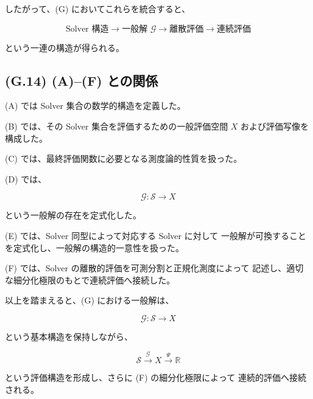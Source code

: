 \documentclass[a4paper,11pt]{article}
\begin{document}
したがって、(G) においてこれらを統合すると、

\begin{equation}
    \boxed{
        \text{Solver 構造}
        \longrightarrow
        \text{一般解 }\mathcal{G}
        \longrightarrow
        \text{離散評価}
        \longrightarrow
        \text{連続評価}
    }
\end{equation}

という一連の構造が得られる。


\subsection{(G.14) (A)--(F) との関係}
\label{subsec:G14}

(A) では Solver 集合の数学的構造を定義した。

(B) では、その Solver 集合を評価するための一般評価空間
$X$ および評価写像を構成した。

(C) では、最終評価関数に必要となる測度論的性質を扱った。

(D) では、

\begin{equation}
    \mathcal{G}:
    \mathcal{S}\longrightarrow X
\end{equation}

という一般解の存在を定式化した。

(E) では、Solver 同型によって対応する Solver に対して
一般解が可換することを定式化し、一般解の構造的一意性を扱った。

(F) では、Solver の離散的評価を可測分割と正規化測度によって
記述し、適切な細分化極限のもとで連続評価へ接続した。

以上を踏まえると、(G) における一般解は、

\begin{equation}
    \boxed{
        \mathcal{G}:
        \mathcal{S}\longrightarrow X
    }
\end{equation}

という基本構造を保持しながら、

\begin{equation}
    \boxed{
        \mathcal{S}
        \xrightarrow{\mathcal{G}}
        X
        \xrightarrow{\Psi}
        \mathbb{R}
    }
\end{equation}

という評価構造を形成し、さらに (F) の細分化極限によって
連続的評価へ接続される。


\end{document}
